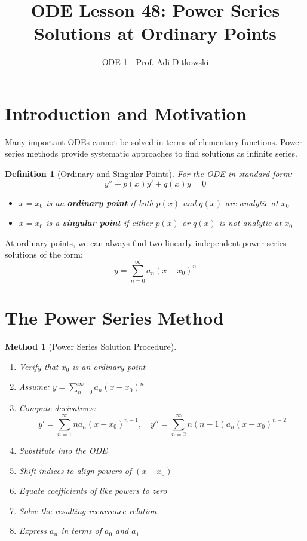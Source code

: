 \documentclass[12pt]{article}
\title{ODE Lesson 48: Power Series Solutions at Ordinary Points}
\author{ODE 1 - Prof. Adi Ditkowski}
\date{}
\newtheorem{definition}{Definition}
\newtheorem{method}{Method}
\begin{document}
\maketitle

\section{Introduction and Motivation}

Many important ODEs cannot be solved in terms of elementary functions. Power series methods provide systematic approaches to find solutions as infinite series.

\begin{definition}[Ordinary and Singular Points]
For the ODE in standard form:
$$y'' + p(x)y' + q(x)y = 0$$
\begin{itemize}
\item $x = x_{0}$ is an \textbf{ordinary point} if both $p(x)$ and $q(x)$ are analytic at $x_{0}$
\item $x = x_{0}$ is a \textbf{singular point} if either $p(x)$ or $q(x)$ is not analytic at $x_{0}$
\end{itemize}
\end{definition}

\begin{keypoint}
At ordinary points, we can always find two linearly independent power series solutions of the form:
$$y = \sum_{n=0}^{\infty} a_{n}(x-x_{0})^{n}$$
\end{keypoint}

\section{The Power Series Method}

\begin{method}[Power Series Solution Procedure]
\begin{enumerate}
\item Verify that $x_{0}$ is an ordinary point
\item Assume: $y = \sum_{n=0}^{\infty} a_{n}(x-x_{0})^{n}$
\item Compute derivatives:
$$y' = \sum_{n=1}^{\infty} na_{n}(x-x_{0})^{n-1}, \quad y'' = \sum_{n=2}^{\infty} n(n-1)a_{n}(x-x_{0})^{n-2}$$
\item Substitute into the ODE
\item Shift indices to align powers of $(x-x_{0})$
\item Equate coefficients of like powers to zero
\item Solve the resulting recurrence relation
\item Express $a_{n}$ in terms of $a_{0}$ and $a_{1}$
\end{enumerate}
\end{method}
\end{document}
